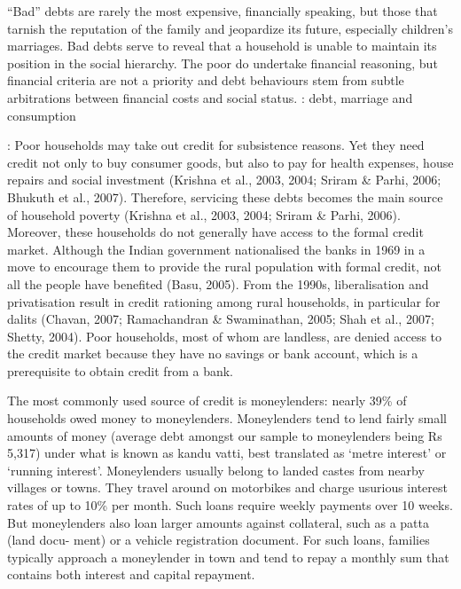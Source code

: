 \documentclass[a4paper, 11pt, onecolumn]{article}
\begin{document}
“Bad” debts are
rarely the most expensive, financially speaking, but those that tarnish the reputation of the
family and jeopardize its future, especially children’s marriages. Bad debts serve to reveal that a household is unable to maintain its position in the social hierarchy. The poor do
undertake financial reasoning, but financial criteria are not a priority and debt behaviours
stem from subtle arbitrations between financial costs and social status.
\cite{James2020} : debt, marriage and consumption





\cite{Bhukuth2018} : Poor households may take out credit for subsistence reasons. Yet they need credit not
only to buy consumer goods, but also to pay for health expenses, house repairs and social
investment (Krishna et al., 2003, 2004; Sriram \& Parhi, 2006; Bhukuth et al., 2007).
Therefore, servicing these debts becomes the main source of household poverty (Krishna
et al., 2003, 2004; Sriram \& Parhi, 2006).
Moreover, these households do not generally have access to the formal credit market.
Although the Indian government nationalised the banks in 1969 in a move to encourage
them to provide the rural population with formal credit, not all the people have benefited
(Basu, 2005). From the 1990s, liberalisation and privatisation result in credit rationing
among rural households, in particular for dalits (Chavan, 2007; Ramachandran \&
Swaminathan, 2005; Shah et al., 2007; Shetty, 2004). Poor households, most of whom
are landless, are denied access to the credit market because they have no savings or bank
account, which is a prerequisite to obtain credit from a bank.



\cite{Carswell2021}

The most commonly used source of credit is moneylenders: nearly 39\% of
households owed money to moneylenders. Moneylenders tend to lend fairly small amounts of money (average debt
amongst our sample to moneylenders being Rs 5,317) under what is known as kandu vatti, best translated as ‘metre
interest’ or ‘running interest’. Moneylenders usually belong to landed castes from nearby villages or towns. They
travel around on motorbikes and charge usurious interest rates of up to 10\% per month. Such loans require weekly
payments over 10 weeks. But moneylenders also loan larger amounts against collateral, such as a patta (land docu-
ment) or a vehicle registration document. For such loans, families typically approach a moneylender in town and tend
to repay a monthly sum that contains both interest and capital repayment.
\end{document}

